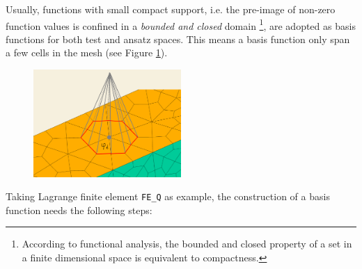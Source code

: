 \documentclass[11pt, a4paper]{book}
\begin{document}
Usually, functions with small compact support, i.e. the pre-image of non-zero function
values is confined in a \emph{bounded and closed} domain \footnote{According to functional
  analysis, the bounded and closed property of a set in a finite dimensional space is
  equivalent to compactness.}, are adopted as basis functions for both test and ansatz
spaces. This means a basis function only span a few cells in the mesh (see Figure
\ref{fig:basis-function-with-compact-support}).
\begin{figure}[htbp]
  \centering
  \includegraphics[width=0.5\textwidth, height=\textheight,
  keepaspectratio]{figures/basis-function-with-compact-support-on-mesh-draft}
  \caption{}
  \label{fig:basis-function-with-compact-support}
\end{figure}
Taking Lagrange finite element \texttt{FE\_Q} as example, the construction of a basis
function needs the following steps:
\end{document}
